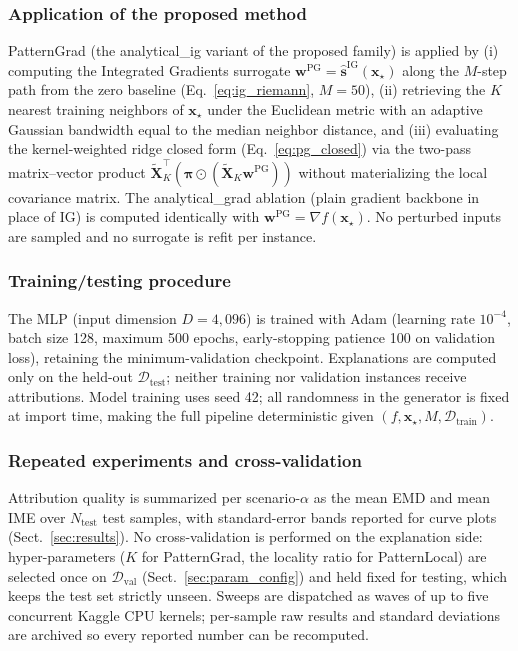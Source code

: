 \documentclass[pdflatex,sn-mathphys-num]{sn-jnl}
\theoremstyle{thmstyleone}
\theoremstyle{thmstyletwo}%
\theoremstyle{thmstylethree}%
\begin{document}
\subsubsection{Application of the proposed method}
PatternGrad (the analytical\_ig variant of the proposed family) is applied by (i) computing the Integrated Gradients surrogate $\mathbf{w}^{\text{PG}}=\hat{\mathbf{s}}^{\text{IG}}(\mathbf{x}_\star)$ along the $M$-step path from the zero baseline (Eq.~\eqref{eq:ig_riemann}, $M=50$), (ii) retrieving the $K$ nearest training neighbors of $\mathbf{x}_\star$ under the Euclidean metric with an adaptive Gaussian bandwidth equal to the median neighbor distance, and (iii) evaluating the kernel-weighted ridge closed form (Eq.~\eqref{eq:pg_closed}) via the two-pass matrix--vector product $\tilde{\mathbf{X}}_K^\top(\boldsymbol{\pi}\odot(\tilde{\mathbf{X}}_K\mathbf{w}^{\text{PG}}))$ without materializing the local covariance matrix. The analytical\_grad ablation (plain gradient backbone in place of IG) is computed identically with $\mathbf{w}^{\text{PG}}=\nabla f(\mathbf{x}_\star)$. No perturbed inputs are sampled and no surrogate is refit per instance.

\subsubsection{Training/testing procedure}
The MLP (input dimension $D=4{,}096$) is trained with Adam (learning rate $10^{-4}$, batch size 128, maximum 500 epochs, early-stopping patience 100 on validation loss), retaining the minimum-validation checkpoint. Explanations are computed only on the held-out $\mathcal{D}_{\text{test}}$; neither training nor validation instances receive attributions. Model training uses seed 42; all randomness in the generator is fixed at import time, making the full pipeline deterministic given $(f,\mathbf{x}_\star,M,\mathcal{D}_{\text{train}})$.

\subsubsection{Repeated experiments and cross-validation}
Attribution quality is summarized per scenario-$\alpha$ as the mean EMD and mean IME over $N_{\text{test}}$ test samples, with standard-error bands reported for curve plots (Sect.~\ref{sec:results}). No cross-validation is performed on the explanation side: hyper-parameters ($K$ for PatternGrad, the locality ratio for PatternLocal) are selected once on $\mathcal{D}_{\text{val}}$ (Sect.~\ref{sec:param_config}) and held fixed for testing, which keeps the test set strictly unseen. Sweeps are dispatched as waves of up to five concurrent Kaggle CPU kernels; per-sample raw results and standard deviations are archived so every reported number can be recomputed.
\end{document}
